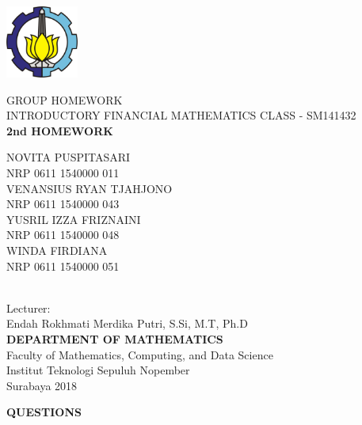 \documentclass{article}
\begin{document}
	{
		\large
		\thispagestyle{empty}
		\begin{flushleft}
			\includegraphics[width=90px]{lambang-its-color-std.png}\\
			{\selectfont
				\vspace{4cm}
				GROUP HOMEWORK\\
				INTRODUCTORY FINANCIAL MATHEMATICS CLASS - SM141432\\
				\vspace{0.2cm}
				\textbf{2nd HOMEWORK}\vspace{0.4cm}
				
				\begin{minipage}{10cm}
					\flushleft
					NOVITA PUSPITASARI\\NRP 0611 1540000 011\\ \vspace{0.15cm}
					VENANSIUS RYAN TJAHJONO\\NRP 0611 1540000 043\\ \vspace{0.15cm}
					YUSRIL IZZA FRIZNAINI\\NRP 0611 1540000 048\\ \vspace{0.15cm}
					WINDA FIRDIANA\\NRP 0611 1540000 051\\ \vspace{0.15cm}
				\end{minipage}
				\\
				\vspace{1cm}
				Lecturer: \\
				Endah Rokhmati Merdika Putri, S.Si, M.T, Ph.D\\
				\vspace{1cm}
				\textbf{DEPARTMENT OF MATHEMATICS}\\
				Faculty of Mathematics, Computing, and Data Science\\
				Institut Teknologi Sepuluh Nopember\\
				Surabaya 2018\\
			}
		\end{flushleft}
	}
	\pagebreak
	\begin{center}
		\textbf{QUESTIONS}
	\end{center}
\end{document}

